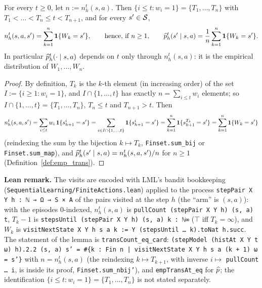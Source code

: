 \begin{lemma}\label{lem:emp_trans_reindex}
\leanok
{}
For every $t \ge 0$, let $n := n^t_h(s,a)$. Then $\{i \le t : w_i = 1\} = \{T_1, \dots, T_n\}$
with $T_1 < \dots < T_n \le t < T_{n+1}$, and for every $s' \in \mathcal{S}$,
\[
  n^t_h(s, a, s') = \sum_{k = 1}^{n}\mathbf{1}\{W_k = s'\}, \qquad\text{hence, if } n \ge 1,\qquad
  \widehat{p}^t_h(s' \mid s, a) = \frac1n\sum_{k=1}^n\mathbf{1}\{W_k = s'\} .
\]
In particular $\widehat{p}^t_h(\cdot \mid s,a)$ depends on $t$ only through $n^t_h(s,a)$: it is the
empirical distribution of $W_1, \dots, W_{n}$.
\end{lemma}

\begin{proof}
\leanok
By definition, $T_k$ is the $k$-th element (in increasing order) of the set
$I := \{i \ge 1 : w_i = 1\}$, and $I \cap \{1, \dots, t\}$ has exactly $n = \sum_{i \le t} w_i$
elements; so $I \cap \{1,\dots,t\} = \{T_1, \dots, T_n\}$, $T_n \le t$ and $T_{n+1} > t$. Then
\[
  n^t_h(s,a,s') = \sum_{i \le t} w_i\,\mathbf{1}\{s^i_{h+1} = s'\}
  = \sum_{i \in I \cap \{1,\dots,t\}}\mathbf{1}\{s^i_{h+1} = s'\}
  = \sum_{k=1}^n\mathbf{1}\{s^{T_k}_{h+1} = s'\} = \sum_{k=1}^n\mathbf{1}\{W_k = s'\}
\]
(reindexing the sum by the bijection $k \mapsto T_k$, \texttt{Finset.sum\_bij} or
\texttt{Finset.sum\_map}), and $\widehat{p}^t_h(s'\mid s,a) = n^t_h(s,a,s')/n$ for $n \ge 1$
(Definition~\ref{def:emp_trans}).
\end{proof}

\textbf{Lean remark.} The visits are encoded with LML's bandit bookkeeping
(\texttt{SequentialLearning/FiniteActions.lean}) applied to the process
\texttt{stepPair X Y h : ℕ → Ω → S × A} of the pairs visited at the step $h$ (the ``arm'' is
$(s, a)$): with the episodes $0$-indexed, $n^t_h(s,a)$ is \texttt{pullCount (stepPair X Y h) (s, a) t},
$T_k - 1$ is \texttt{stepsUntil (stepPair X Y h) (s, a) k : ℕ∞} ($\top$ iff $T_k = \infty$), and
$W_k$ is \texttt{visitNextState X Y h s a k := Y (stepsUntil … k).toNat h.succ}. The statement of
the lemma is \texttt{transCount\_eq\_card}:
\texttt{(stepModel (histAt X Y t ω) h).2.2 (s, a) s' = \#\{k : Fin n | visitNextState X Y h s a (k + 1) ω = s'\}}
with $n = n^t_h(s, a)$ (the reindexing $k \mapsto T_{k+1}$, with inverse
$i \mapsto$ \texttt{pullCount … i}, is inside its proof, \texttt{Finset.sum\_nbij'}), and
\texttt{empTransAt\_eq} for $\widehat{p}$; the identification $\{i \le t : w_i = 1\} = \{T_1, \dots, T_n\}$
is not stated separately.

